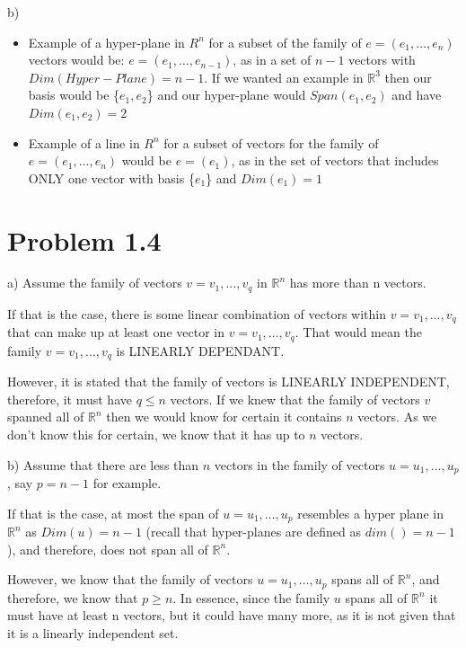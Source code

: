 \documentclass{article}
\begin{document}
b) 
\begin{itemize}
    \item Example of a hyper-plane in ${R}^n$ for a subset of the family of $e = (e_1, \dots, e_n)$ vectors would be: $e = (e_1, \dots, e_{n-1})$, as in a set of $n-1$ vectors with $Dim(Hyper-Plane) = n-1$. If we wanted an example in $\mathbb{R}^3$ then our basis would be \{$e_1,e_2$\}  and our hyper-plane would $Span(e_1,e_2)$ and have $Dim(e_1,e_2)=2$
    \item Example of a line in ${R}^n$ for a subset of vectors for the family of  $e = (e_1, \dots, e_n)$ would be $e = (e_1)$, as in the set of vectors that includes ONLY one vector with basis \{$e_1$\} and $Dim(e_1) = 1$
\end{itemize}
\break

\section{Problem 1.4}

    a) Assume the family of vectors $v = {v_1,\dots, v_q}$ in $\mathbb{R}^n$ has more than n vectors. 
    \par
    If that is the case, there is some linear combination of vectors within $v = {v_1,\dots, v_q}$ that can make up at least one vector in $v = {v_1,\dots, v_q}$. That would mean the family $v = {v_1,\dots, v_q}$ is LINEARLY DEPENDANT.\par
    However, it is stated that the family of vectors is LINEARLY INDEPENDENT, therefore, it must have $q\leq n$ vectors. If we knew that the family of vectors $v$ spanned all of $\mathbb{R}^n$ then we would know for certain it contains $n$ vectors. As we don't know this for certain, we know that it has up to $n$ vectors.

\par
b) Assume that there are less than $n$ vectors in the family of vectors $u = {u_1, \dots, u_p}$, say $p=n-1$ for example. 
\par
If that is the case, at most the span of $u = {u_1, \dots, u_p}$ resembles a hyper plane in $\mathbb{R}^n$ as $Dim(u)=n-1$ (recall that hyper-planes are defined as $dim()=n-1$), and therefore, does not span all of $\mathbb{R}^n$.
\par
However, we know that the family of vectors $u = {u_1, \dots, u_p}$ spans all of $\mathbb{R}^n$, and therefore, we know that $p\geq n$. In essence, since the family $u$ spans all of $\mathbb{R}^n$ it must have at least n vectors, but it could have many more, as it is not given that it is a linearly independent set.
\end{document}
